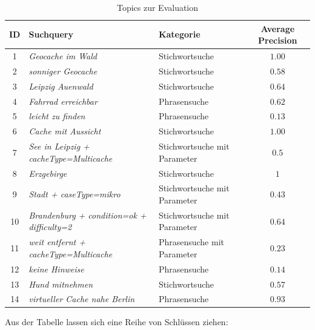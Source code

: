\documentclass[11pt,a4paper]{scrreprt}
\begin{document}
\begin{table}
\caption{Topics zur Evaluation}
\label{table:eval}
\renewcommand{\arraystretch}{1.5}
\begin{tabular}{cllc}
\toprule
ID 	&	Suchquery							&	Kategorie 				&	Average Precision\\
\midrule
1	&	\textit{Geocache im Wald}					&	Stichwortsuche			&	$1.00$\\
2	&	\textit{sonniger Geocache}				&	Stichwortsuche			&	$0.58$\\
3	&	\textit{Leipzig Auenwald}					&	Stichwortsuche			&	$0.64$\\
4	&	\textit{Fahrrad erreichbar}				&	Phrasensuche			&	$0.62$\\
5	&	\textit{leicht zu finden}					&	Phrasensuche			&	$0.13$\\
6	&	\textit{Cache mit Aussicht}				&	Stichwortsuche			&	$1.00$\\
7	&	\textit{See in Leipzig + cacheType=Multicache}	&	Stichwortsuche mit Parameter	& 	$0.5$\\
8	&	\textit{Erzgebirge}						&	Stichwortsuche			&	$1$\\
9	&	\textit{Stadt + caseType=mikro}				&	Stichwortsuche mit Parameter	&	$0.43$\\
10	&	\textit{Brandenburg + condition=ok + difficulty=2} 	&	Stichwortsuche mit Parameter	&	$0.64$\\
11	&	\textit{weit entfernt + cacheType=Multicache}	&	Phrasensuche mit Parameter	&	$0.23$\\
12	&	\textit{keine Hinweise}					&	Phrasensuche			&	$0.14$\\
13	&	\textit{Hund mitnehmen}					&	Stichwortsuche			&	$0.57$\\
14	&	\textit{virtueller Cache nahe Berlin}			&	Phrasensuche			&	$0.93$\\
\bottomrule
\end{tabular}
\end{table}

Aus der Tabelle lassen sich eine Reihe von Schlüssen ziehen:
\end{document}
